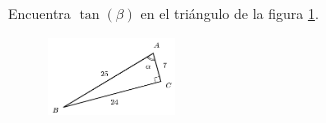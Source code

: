 \question[15] Encuentra $\tan(\beta)$ en el triángulo de la figura \ref{fig:functrig16}.
\begin{figure}[H]
    \begin{center}
        \includegraphics[width=0.3\textwidth]{../images/functrig16.png}
    \end{center}
    \caption{}
    \label{fig:functrig16}
\end{figure}
